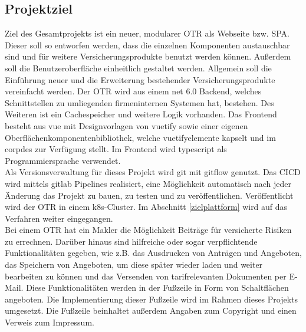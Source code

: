 \subsection{Projektziel}
\label{projektziel}
Ziel des Gesamtprojekts ist ein neuer, modularer \ac{OTR} als Webseite bzw. \ac{SPA}. Dieser soll so entworfen werden, dass die einzelnen Komponenten austauschbar sind und für weitere Versicherungsprodukte benutzt werden können. Außerdem soll die Benutzeroberfläche einheitlich gestaltet werden. Allgemein soll die Einführung neuer und die Erweiterung bestehender Versicherungsprodukte vereinfacht werden. Der \ac{OTR} wird aus einem \gls{net} 6.0 Backend, welches Schnittstellen zu umliegenden firmeninternen Systemen hat, bestehen. Des Weiteren ist ein Cachespeicher und weitere Logik vorhanden. Das Frontend besteht aus \gls{vue} mit Designvorlagen von \gls{vuetify} sowie einer eigenen Oberflächenkomponentenbibliothek, welche \gls{vuetify}elemente kapselt und im \gls{corpdes} zur Verfügung stellt. Im Frontend wird \gls{typescript} als Programmiersprache verwendet.\\
Als Versionsverwaltung für dieses Projekt wird \gls{git} mit \gls{gitflow} genutzt. Das \ac{CICD} wird mittels \gls{gitlab} Pipelines realisiert, eine Möglichkeit automatisch nach jeder Änderung das Projekt zu bauen, zu testen und zu veröffentlichen. Veröffentlicht wird der \ac{OTR} in einem \gls{k8s}-Cluster. Im Abschnitt \ref{zielplattform}  wird auf das Verfahren weiter eingegangen.
\\
Bei einem \ac{OTR} hat ein Makler die Möglichkeit Beiträge für versicherte Risiken zu errechnen. Darüber hinaus sind hilfreiche oder sogar verpflichtende Funktionalitäten gegeben, wie z.B. das Ausdrucken von Anträgen und Angeboten, das Speichern von Angeboten, um diese später wieder laden und weiter bearbeiten zu können und das Versenden von tarifrelevanten Dokumenten per E-Mail. Diese Funktionalitäten werden in der Fußzeile in Form von Schaltflächen angeboten. Die Implementierung dieser Fußzeile wird im Rahmen dieses Projekts umgesetzt. Die Fußzeile beinhaltet außerdem Angaben zum Copyright und einen Verweis zum Impressum.
\\

